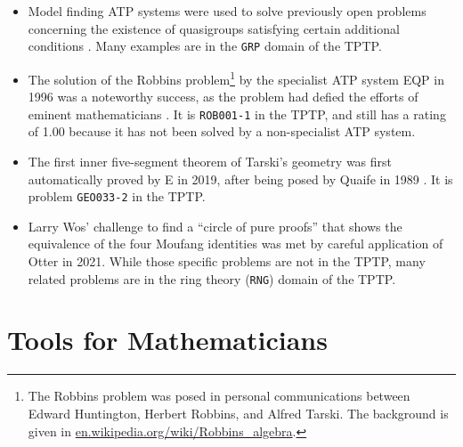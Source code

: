 \documentclass[runningheads]{llncs}
\begin{document}
\begin{itemize}
\item Model finding ATP systems were used to solve previously open problems concerning the
      existence of quasigroups satisfying certain additional conditions \cite{SFS95}.
      Many examples are in the {\tt GRP} domain of the TPTP.
\item The solution of the Robbins problem\footnote{%
      The Robbins problem was posed in personal communications between Edward Huntington,
      Herbert Robbins, and Alfred Tarski.
      The background is given in
      \href{https://en.wikipedia.org/wiki/Robbins_algebra}{en.wikipedia.org/wiki/Robbins\_algebra}.}
      by the specialist ATP system EQP \cite{McC97}
      in 1996 was a noteworthy success, as the problem had defied the efforts of eminent
      mathematicians \cite{HMT71}.
      It is {\tt ROB001-1} in the TPTP, and still has a rating of 1.00 because
      it has not been solved by a non-specialist ATP system.
\item The first inner five-segment theorem of Tarski's geometry \cite{SST83} was first
      automatically proved by E \cite{Sch13-LPAR} in 2019, after being posed by Quaife in
      1989 \cite{Qua89}.
      It is problem {\tt GEO033-2} in the TPTP.
\item Larry Wos' challenge to find a ``circle of pure proofs'' that shows the equivalence
      of the four Moufang identities \cite{Wos19} was met by careful application \cite{Ver22} of
      Otter \cite{McC03-Otter} in 2021.
      While those specific problems are not in the TPTP, many related problems are in the
      ring theory ({\tt RNG}) domain of the TPTP.
\end{itemize}

\section{Tools for Mathematicians}
\label{Tools}
\end{document}
